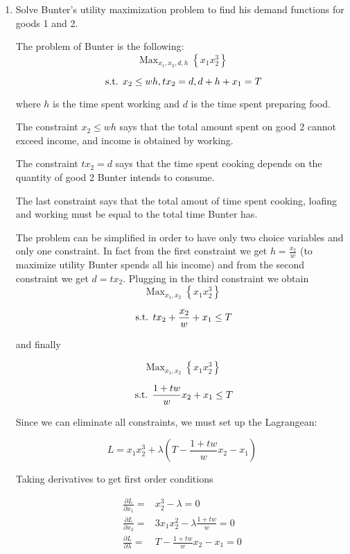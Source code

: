 \documentclass{article}
\DeclareMathOperator*{\Max}{Max}
\newcommand{\st}{\hbox{ s.t. }}
\begin{document}
\begin{enumerate}
\item Solve Bunter's utility maximization problem to find his demand functions for goods 1 and 2.

\color{red}

The problem of Bunter is the following:\\
\[ \Max_{x_1,x_2,d,h} \left\{x_1 x_2^3 \right\} \] 

\[ \st x_2 \leq w h, t x_2 = d, d + h + x_1 = T \]

where $h$ is the time spent working and $d$ is the time spent preparing food.

The constraint $x_2 \leq wh$ says that the total amount spent on good 2 cannot exceed income, and income is obtained by working.

The constraint $tx_2 = d$ says that the time spent cooking depends on the quantity of good 2 Bunter intends to consume.

The last constraint says that the total amout of time spent cooking, loafing and working must be equal to the total time Bunter has.

The problem can be simplified in order to have only two choice variables and only one constraint.
In fact from the first constraint we get $h=\frac{x_2}{w}$ (to maximize utility Bunter spends all his income) and from the second constraint we get $d = t x_2$. Plugging in the third constraint we obtain
\[ \Max_{x_1,x_2} \left\{ x_1 x_2^3\right\} \]

\[ \st t x_2 + \frac{x_2}{w} + x_1 \leq T \]

and finally

\[ \Max_{x_1,x_2} \left\{ x_1 x_2^3\right\} \]

\[ \st \frac{1+t w}{w} x_2+ x_1 \leq T \]

Since we can eliminate all constraints, we must set up the Lagrangean:

\[ L = x_1 x_2^3 + \lambda \left(T - \frac{1+t w}{w}x_2 -x_1 \right) \]

Taking derivatives to get first order conditions

\begin{align*}
\frac{\partial L}{\partial x_1} =& x_2^3 - \lambda = 0 \\
\frac{\partial L}{\partial x_2} =& 3 x_1 x_2^2 - \lambda \frac{1+ t w}{w} = 0 \\
\frac{\partial L}{\partial \lambda} =&  T - \frac{1+t w}{w}x_2 -x_1 = 0
\end{align*}


\end{enumerate}
\end{document}
